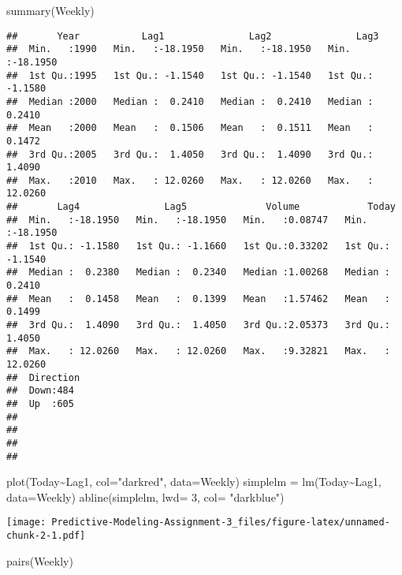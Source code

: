 \documentclass[
]{article}
\newenvironment{Shaded}{\begin{snugshade}}{\end{snugshade}}
\newcommand{\AttributeTok}[1]{\textcolor[rgb]{0.77,0.63,0.00}{#1}}
\newcommand{\DecValTok}[1]{\textcolor[rgb]{0.00,0.00,0.81}{#1}}
\newcommand{\FunctionTok}[1]{\textcolor[rgb]{0.00,0.00,0.00}{#1}}
\newcommand{\NormalTok}[1]{#1}
\newcommand{\OtherTok}[1]{\textcolor[rgb]{0.56,0.35,0.01}{#1}}
\newcommand{\SpecialCharTok}[1]{\textcolor[rgb]{0.00,0.00,0.00}{#1}}
\newcommand{\StringTok}[1]{\textcolor[rgb]{0.31,0.60,0.02}{#1}}
\begin{document}
\begin{Shaded}
\begin{Highlighting}[]
\FunctionTok{summary}\NormalTok{(Weekly)}
\end{Highlighting}
\end{Shaded}

\begin{verbatim}
##       Year           Lag1               Lag2               Lag3         
##  Min.   :1990   Min.   :-18.1950   Min.   :-18.1950   Min.   :-18.1950  
##  1st Qu.:1995   1st Qu.: -1.1540   1st Qu.: -1.1540   1st Qu.: -1.1580  
##  Median :2000   Median :  0.2410   Median :  0.2410   Median :  0.2410  
##  Mean   :2000   Mean   :  0.1506   Mean   :  0.1511   Mean   :  0.1472  
##  3rd Qu.:2005   3rd Qu.:  1.4050   3rd Qu.:  1.4090   3rd Qu.:  1.4090  
##  Max.   :2010   Max.   : 12.0260   Max.   : 12.0260   Max.   : 12.0260  
##       Lag4               Lag5              Volume            Today         
##  Min.   :-18.1950   Min.   :-18.1950   Min.   :0.08747   Min.   :-18.1950  
##  1st Qu.: -1.1580   1st Qu.: -1.1660   1st Qu.:0.33202   1st Qu.: -1.1540  
##  Median :  0.2380   Median :  0.2340   Median :1.00268   Median :  0.2410  
##  Mean   :  0.1458   Mean   :  0.1399   Mean   :1.57462   Mean   :  0.1499  
##  3rd Qu.:  1.4090   3rd Qu.:  1.4050   3rd Qu.:2.05373   3rd Qu.:  1.4050  
##  Max.   : 12.0260   Max.   : 12.0260   Max.   :9.32821   Max.   : 12.0260  
##  Direction 
##  Down:484  
##  Up  :605  
##            
##            
##            
## 
\end{verbatim}

\begin{Shaded}
\begin{Highlighting}[]
\FunctionTok{plot}\NormalTok{(Today}\SpecialCharTok{\textasciitilde{}}\NormalTok{Lag1, }\AttributeTok{col=}\StringTok{"darkred"}\NormalTok{, }\AttributeTok{data=}\NormalTok{Weekly)}
\NormalTok{simplelm }\OtherTok{=} \FunctionTok{lm}\NormalTok{(Today}\SpecialCharTok{\textasciitilde{}}\NormalTok{Lag1, }\AttributeTok{data=}\NormalTok{Weekly)}
\FunctionTok{abline}\NormalTok{(simplelm, }\AttributeTok{lwd=} \DecValTok{3}\NormalTok{, }\AttributeTok{col=} \StringTok{"darkblue"}\NormalTok{)}
\end{Highlighting}
\end{Shaded}

\texttt{[image: Predictive-Modeling-Assignment-3\_files/figure-latex/unnamed-chunk-2-1.pdf]}

\begin{Shaded}
\begin{Highlighting}[]
\FunctionTok{pairs}\NormalTok{(Weekly)}
\end{Highlighting}
\end{Shaded}
\end{document}
